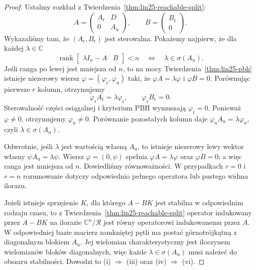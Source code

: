 \begin{proof}
Ustalmy rozkład z
Twierdzenia~\ref{thm:lin25-reachable-split}:
\[
 A=\begin{pmatrix}A_{\mathrm r}&D\\0&A_{\mathrm u}\end{pmatrix},
 \qquad
 B=\begin{pmatrix}B_{\mathrm r}\\0\end{pmatrix}.
\]
Wykazaliśmy tam, że
\((A_{\mathrm r},B_{\mathrm r})\)
jest sterowalna.
Pokażemy najpierw,
że dla każdej
\(\lambda\in\mathbb C\)
\[
 \operatorname{rank}
 \begin{bmatrix}\lambda I_n-A&B\end{bmatrix}<n
 \quad\Longleftrightarrow\quad
 \lambda\in\sigma(A_{\mathrm u}).
\]
Jeśli ranga po lewej
jest mniejsza od \(n\),
to na mocy
Twierdzenia~\ref{thm:lin25-pbh}
istnieje niezerowy wiersz
\(\varphi=(\varphi_{\mathrm r},
\varphi_{\mathrm u})\)
taki, że
\(\varphi A=\lambda\varphi\)
i \(\varphi B=0\).
Porównując pierwsze
\(r\) kolumn, otrzymujemy
\[
 \varphi_{\mathrm r}A_{\mathrm r}
  =\lambda\varphi_{\mathrm r},
 \qquad
 \varphi_{\mathrm r}B_{\mathrm r}=0.
\]
Sterowalność części osiągalnej
i kryterium PBH wymuszają
\(\varphi_{\mathrm r}=0\).
Ponieważ \(\varphi\ne0\),
otrzymujemy
\(\varphi_{\mathrm u}\ne0\).
Porównanie pozostałych kolumn
daje
\(\varphi_{\mathrm u}A_{\mathrm u}
 =\lambda\varphi_{\mathrm u}\),
czyli \(\lambda\in\sigma(A_{\mathrm u})\).

Odwrotnie, jeśli
\(\lambda\) jest wartością własną
\(A_{\mathrm u}\),
to istnieje niezerowy
lewy wektor własny
\(\psi A_{\mathrm u}
 =\lambda\psi\).
Wiersz \(\varphi=(0,\psi)\)
spełnia
\(\varphi A=\lambda\varphi\)
oraz \(\varphi B=0\);
a więc ranga jest
mniejsza od \(n\).
Dowiedliśmy równoważności.
W przypadkach \(r=0\) i \(r=n\)
rozumowanie dotyczy
odpowiednio pełnego operatora
lub pustego widma ilorazu.

Jeżeli istnieje sprzężenie
\(K\), dla którego \(A-BK\)
jest stabilna w odpowiednim
rodzaju czasu, to
z
Twierdzenia~\ref{thm:lin25-reachable-split}
operator indukowany
przez \(A-BK\) na ilorazie
\(\mathbb C^n/\mathcal R\)
jest równy operatorowi
indukowanemu przez \(A\).
W odpowiedniej bazie
macierz zamkniętej pętli
ma postać górnotrójkątną
z diagonalnym blokiem
\(A_{\mathrm u}\).
Jej wielomian
charakterystyczny jest
iloczynem wielomianów
bloków diagonalnych,
więc każde
\(\lambda\in\sigma(A_{\mathrm u})\)
musi należeć do
obszaru stabilności.
Dowodzi to (i) \(\Rightarrow\) (iii)
oraz (iv) \(\Rightarrow\) (vi).


\end{proof}
